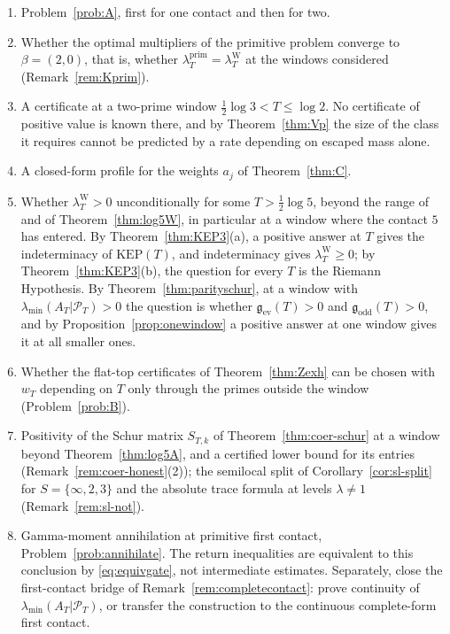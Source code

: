 \documentclass[11pt]{amsart}
\theoremstyle{definition}
\theoremstyle{remark}
\newcommand{\PT}{\mathcal P_T}
\newcommand{\lamP}{\lambda^{\mathrm{prim}}_T}
\newcommand{\lamW}{\lambda^{\mathrm W}_T}
\newcommand{\lamA}{\lambda_{\min}(A_T|\PT)}
\begin{document}
\begin{enumerate}
\item Problem~\ref{prob:A}, first for one contact and then for two.
\item Whether the optimal multipliers of the primitive problem converge to $\beta=(2,0)$, that is,
whether $\lamP=\lamW$ at the windows considered (Remark~\ref{rem:Kprim}).
\item A certificate at a two-prime window $\frac12\log3<T\le\log2$. No certificate of positive value
is known there, and by Theorem~\ref{thm:Vp} the size of the class it requires cannot be predicted by
a rate depending on escaped mass alone.
\item A closed-form profile for the weights $a_j$ of Theorem~\ref{thm:C}.
\item Whether $\lamW>0$ unconditionally for some $T>\frac12\log5$, beyond the range of \cite{Zhu2026}
and of Theorem~\ref{thm:log5W}, in particular at a window where the contact $5$ has entered. By
Theorem~\ref{thm:KEP3}(a), a positive answer at $T$ gives the indeterminacy of $\mathrm{KEP}(T)$, and
indeterminacy gives $\lamW\ge0$; by Theorem~\ref{thm:KEP3}(b), the question for every $T$ is the
Riemann Hypothesis. By Theorem~\ref{thm:parityschur}, at a window with $\lamA>0$ the question is
whether $\mathfrak g_{\mathrm{ev}}(T)>0$ and $\mathfrak g_{\mathrm{odd}}(T)>0$, and by
Proposition~\ref{prop:onewindow} a positive answer at one window gives it at all smaller ones.
\item Whether the flat-top certificates of Theorem~\ref{thm:Zexh} can be chosen with $w_T$ depending
on $T$ only through the primes outside the window (Problem~\ref{prob:B}).
\item Positivity of the Schur matrix $S_{T,k}$ of Theorem~\ref{thm:coer-schur} at a window beyond
Theorem~\ref{thm:log5A}, and a certified lower bound for its entries (Remark~\ref{rem:coer-honest}(2)); the
semilocal split of Corollary~\ref{cor:sl-split} for $S=\{\infty,2,3\}$ and the absolute trace formula at
levels $\lambda\ne1$ (Remark~\ref{rem:sl-not}).
\item Gamma-moment annihilation at primitive first contact, Problem~\ref{prob:annihilate}.  The
return inequalities are equivalent to this conclusion by \eqref{eq:equivgate}, not intermediate
estimates.  Separately, close the first-contact bridge of Remark~\ref{rem:completecontact}: prove
continuity of $\lamA$, or transfer the construction to the continuous complete-form first contact.
\end{enumerate}
\end{document}
